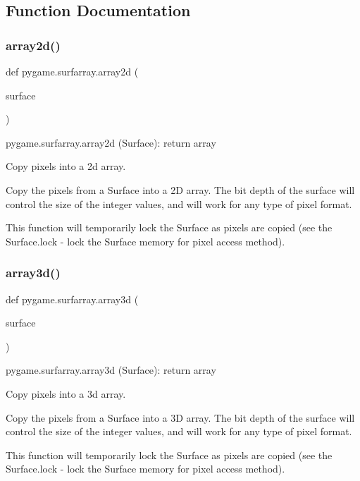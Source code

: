 \subsection{Function Documentation}
\mbox{\label{namespacepygame_1_1surfarray_aa39dd3b2e2b9aa792d63a68ae846a9ca}} 
\subsubsection{\texorpdfstring{array2d()}{array2d()}}
{\footnotesize\ttfamily def pygame.\+surfarray.\+array2d (\begin{DoxyParamCaption}\item[{}]{surface }\end{DoxyParamCaption})}

\begin{DoxyVerb}pygame.surfarray.array2d (Surface): return array

Copy pixels into a 2d array.

Copy the pixels from a Surface into a 2D array. The bit depth of the
surface will control the size of the integer values, and will work
for any type of pixel format.

This function will temporarily lock the Surface as pixels are copied
(see the Surface.lock - lock the Surface memory for pixel access
method).
\end{DoxyVerb}
 \mbox{\label{namespacepygame_1_1surfarray_acce334677092b915a64a591d4caa9b5b}} 
\subsubsection{\texorpdfstring{array3d()}{array3d()}}
{\footnotesize\ttfamily def pygame.\+surfarray.\+array3d (\begin{DoxyParamCaption}\item[{}]{surface }\end{DoxyParamCaption})}

\begin{DoxyVerb}pygame.surfarray.array3d (Surface): return array

Copy pixels into a 3d array.

Copy the pixels from a Surface into a 3D array. The bit depth of the
surface will control the size of the integer values, and will work
for any type of pixel format.

This function will temporarily lock the Surface as pixels are copied
(see the Surface.lock - lock the Surface memory for pixel access
method).
\end{DoxyVerb}
 \mbox{\label{namespacepygame_1_1surfarray_aa5dbca185d506d6f506808de020b5d33}} 
